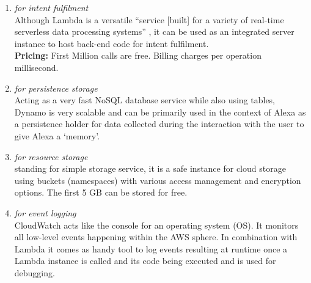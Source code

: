 \begin{enumerate}
%	
	

	\item[\href{https://aws.amazon.com/lambda/}{\textbf{Lambda}} \footnote{\url{https://aws.amazon.com/lambda}}] \textit{for intent fulfilment}\\
	Although Lambda is a versatile ``service [built] for a variety of real-time serverless data processing systems'' \cite{aws_website}, it can be used as an integrated server instance to host back-end code for intent fulfilment.\\	 %
	\textbf{Pricing:} First Million calls are free. Billing charges per operation millisecond.

	
%	
%



\item[\href{https://aws.amazon.com/dynamodb/}{\textbf{DynamoDB}} \footnote{\url{https://aws.amazon.com/dynamodb}}] \textit{for persistence storage}\\
Acting as a very fast NoSQL database service while also using tables,
Dynamo is very scalable and can be primarily used in the context of Alexa as a persistence holder for data collected during the interaction with the user to give Alexa a `memory'.



\item[\href{https://aws.amazon.com/s3/}{\textbf{S3}} \footnote{\url{https://aws.amazon.com/s3}}] \textit{for resource storage}\\
standing for simple storage service, it is a safe instance for cloud storage using buckets (namespaces) with various access management and encryption options. The first 5 GB can be stored for free.


	\item[\href{https://aws.amazon.com/iam/}{\textbf{CloudWatch}} \footnote{\url{https://aws.amazon.com/cloudwatch}}]
	\textit{for event logging}\\
	CloudWatch acts like the console for an operating system (OS). It monitors all low-level events happening within the AWS sphere. In combination with Lambda it comes as handy tool to log events resulting at runtime once a Lambda instance is called and its code being executed and is used for debugging.
	

\end{enumerate}
